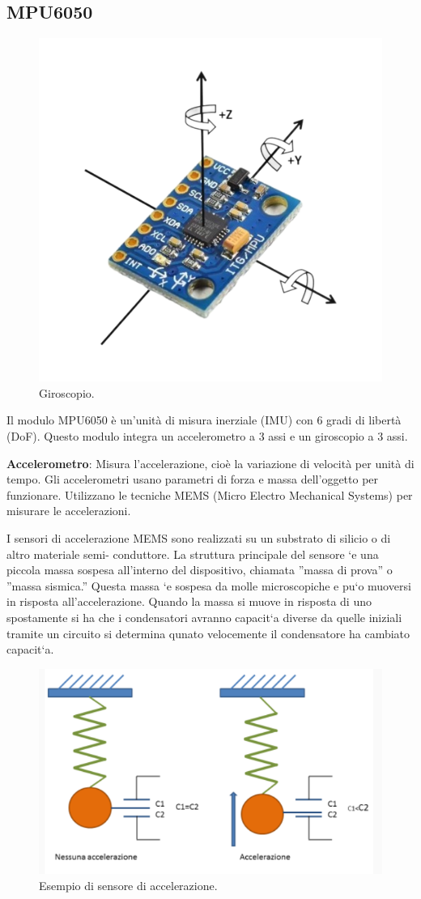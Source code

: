 \documentclass{article}
\begin{document}
\subsection{MPU6050}
\begin{figure}[H]
\centering
\includegraphics[width=0.6\linewidth]{image/giroscopio.png}
\caption{\label{fig:giroscopio}Giroscopio.}
\end{figure}
Il modulo MPU6050 è un'unità di misura inerziale (IMU) con 6 gradi di libertà (DoF). Questo modulo integra un accelerometro a 3 assi e un giroscopio a 3 assi.
\vspace{0.1cm}

\textbf{Accelerometro}: Misura l'accelerazione, cioè la variazione di velocità per unità di tempo. Gli accelerometri usano parametri di forza e massa dell'oggetto per funzionare. Utilizzano le tecniche MEMS (Micro Electro Mechanical Systems) per misurare le accelerazioni.

I sensori di accelerazione MEMS sono realizzati su un substrato di silicio o di altro materiale semi-
conduttore. La struttura principale del sensore `e una piccola massa sospesa all’interno del dispositivo,
chiamata ”massa di prova” o ”massa sismica.” Questa massa `e sospesa da molle microscopiche e pu`o
muoversi in risposta all’accelerazione. Quando la massa si muove in risposta di uno spostamente si ha
che i condensatori avranno capacit`a diverse da quelle iniziali tramite un circuito si determina qunato
velocemente il condensatore ha cambiato capacit`a.

\begin{figure}[H]
\centering
\includegraphics[width=0.82\linewidth]{image/acc.png}
\caption{\label{acc:pot} Esempio di sensore di accelerazione.}
\end{figure}
\end{document}
